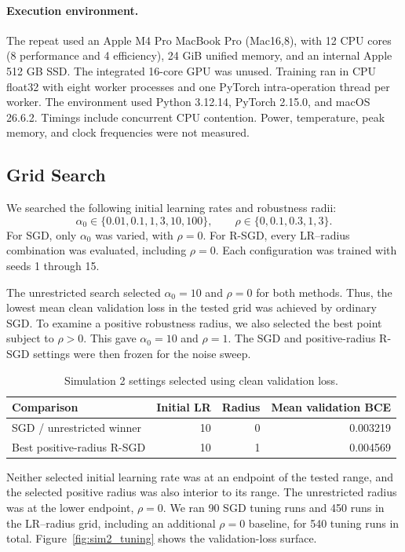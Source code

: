 \paragraph{Execution environment.}
The repeat used an Apple M4 Pro MacBook Pro (Mac16,8), with 12 CPU cores
(8 performance and 4 efficiency), 24 GiB unified memory, and an internal Apple
512 GB SSD. The integrated 16-core GPU was unused.
Training ran in CPU float32 with eight worker processes and one PyTorch
intra-operation thread per worker. The environment used Python 3.12.14,
PyTorch 2.15.0, and macOS 26.6.2. Timings include concurrent CPU contention.
Power, temperature, peak memory, and clock frequencies were not measured.

\subsection{Grid Search}
\label{sec:sim2_search}

We searched the following initial learning rates and robustness radii:
\[
\alpha_0\in\{0.01,0.1,1,3,10,100\},
\qquad
\rho\in\{0,0.1,0.3,1,3\}.
\]
For SGD, only $\alpha_0$ was varied, with $\rho=0$.
For R-SGD, every LR--radius combination was evaluated, including $\rho=0$.
Each configuration was trained with seeds 1 through 15.

The unrestricted search selected $\alpha_0=10$ and $\rho=0$ for both methods.
Thus, the lowest mean clean validation loss in the tested grid was achieved by
ordinary SGD. To examine a positive robustness radius, we also selected the
best point subject to $\rho>0$. This gave $\alpha_0=10$ and $\rho=1$.
The SGD and positive-radius R-SGD settings were then frozen for the noise sweep.

\begin{table}[htbp]
\centering
\begin{tabular}{lrrr}
\toprule
Comparison & Initial LR & Radius & Mean validation BCE\\
\midrule
SGD / unrestricted winner & 10 & 0 & 0.003219\\
Best positive-radius R-SGD & 10 & 1 & 0.004569\\
\bottomrule
\end{tabular}
\caption{Simulation 2 settings selected using clean validation loss.}
\label{tab:sim2_selection}
\end{table}

Neither selected initial learning rate was at an endpoint of the tested range,
and the selected positive radius was also interior to its range.
The unrestricted radius was at the lower endpoint, $\rho=0$.
We ran 90 SGD tuning runs and 450 runs in the LR--radius grid,
including an additional $\rho=0$ baseline, for 540 tuning runs in total.
Figure~\ref{fig:sim2_tuning} shows the validation-loss surface.

